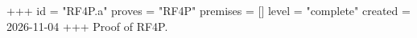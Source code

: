 +++
id = "RF4P.a"
proves = "RF4P"
premises = []
level = "complete"
created = 2026-11-04
+++
Proof of RF4P.
